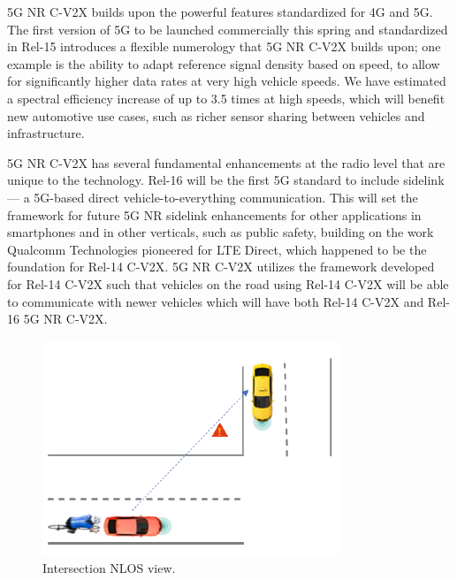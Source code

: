 \documentclass[conference,12pt,onecolumn]{IEEEtran}
\begin{document}
5G NR C-V2X builds upon the powerful features standardized for 4G and 5G. The first version of 5G to be launched commercially this spring and standardized in Rel-15 introduces a flexible numerology that 5G NR C-V2X builds upon; one example is the ability to adapt reference signal density based on speed, to allow for significantly higher data rates at very high vehicle speeds. We have estimated a spectral efficiency increase of up to 3.5 times at high speeds, which will benefit new automotive use cases, such as richer sensor sharing between vehicles and infrastructure.

5G NR C-V2X has several fundamental enhancements at the radio level that are unique to the technology. Rel-16 will be the first 5G standard to include sidelink — a 5G-based direct vehicle-to-everything communication. This will set the framework for future 5G NR sidelink enhancements for other applications in smartphones and in other verticals, such as public safety, building on the work Qualcomm Technologies pioneered for LTE Direct, which happened to be the foundation for Rel-14 C-V2X. 5G NR C-V2X utilizes the framework developed for Rel-14 C-V2X such that vehicles on the road using Rel-14 C-V2X will be able to communicate with newer vehicles which will have both Rel-14 C-V2X and Rel-16 5G NR C-V2X.

\begin{figure} [ht]
   \centering
  \includegraphics[width=0.5\linewidth]{_Graphics/intersection.png}
  \caption{Intersection NLOS view. \cite{5gamericas2018}}
  \label{fig:intersection}
\end{figure}
\end{document}
